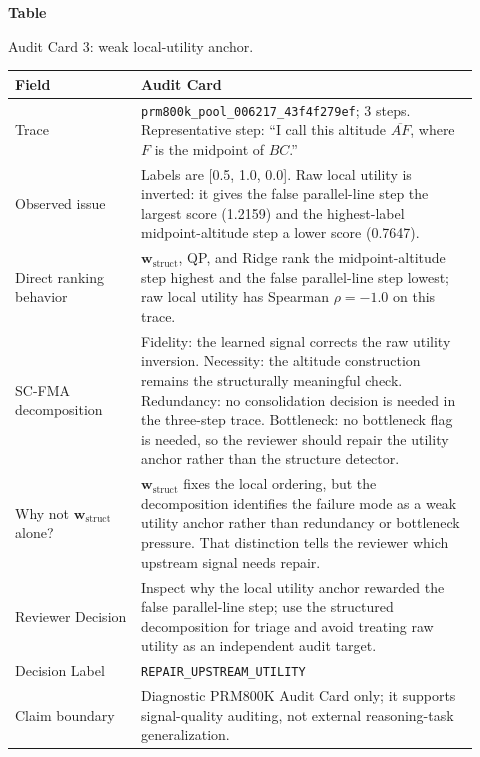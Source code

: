\documentclass[a4paper,fleqn]{cas-sc}
\newcommand{\wstruct}{\ensuremath{\mathbf{w}_{\mathrm{struct}}}}
\begin{document}
\par\medskip
{}\label{tab:audit-card-utility}
\noindent\textbf{Table~\thetable}\par
\noindent Audit Card 3: weak local-utility anchor.
\begin{center}
\small
\renewcommand{\arraystretch}{1.08}
\begin{tabular}{p{0.25\linewidth}p{0.67\linewidth}}
\toprule
\textbf{Field} & \textbf{Audit Card} \\
\midrule
Trace & \texttt{prm800k\_pool\_006217\_43f4f279ef}; 3 steps. Representative step: ``I call this altitude $\overline{AF}$, where $F$ is the midpoint of $BC$.'' \\
Observed issue & Labels are [0.5, 1.0, 0.0]. Raw local utility is inverted: it gives the false parallel-line step the largest score (1.2159) and the highest-label midpoint-altitude step a lower score (0.7647). \\
Direct ranking behavior & \wstruct{}, QP, and Ridge rank the midpoint-altitude step highest and the false parallel-line step lowest; raw local utility has Spearman $\rho=-1.0$ on this trace. \\
SC-FMA decomposition & Fidelity: the learned signal corrects the raw utility inversion. Necessity: the altitude construction remains the structurally meaningful check. Redundancy: no consolidation decision is needed in the three-step trace. Bottleneck: no bottleneck flag is needed, so the reviewer should repair the utility anchor rather than the structure detector. \\
Why not \wstruct{} alone? & \wstruct{} fixes the local ordering, but the decomposition identifies the failure mode as a weak utility anchor rather than redundancy or bottleneck pressure. That distinction tells the reviewer which upstream signal needs repair. \\
Reviewer Decision & Inspect why the local utility anchor rewarded the false parallel-line step; use the structured decomposition for triage and avoid treating raw utility as an independent audit target. \\
Decision Label & \texttt{REPAIR\_UPSTREAM\_UTILITY} \\
Claim boundary & Diagnostic PRM800K Audit Card only; it supports signal-quality auditing, not external reasoning-task generalization. \\
\bottomrule
\end{tabular}
\end{center}
\medskip
\end{document}
